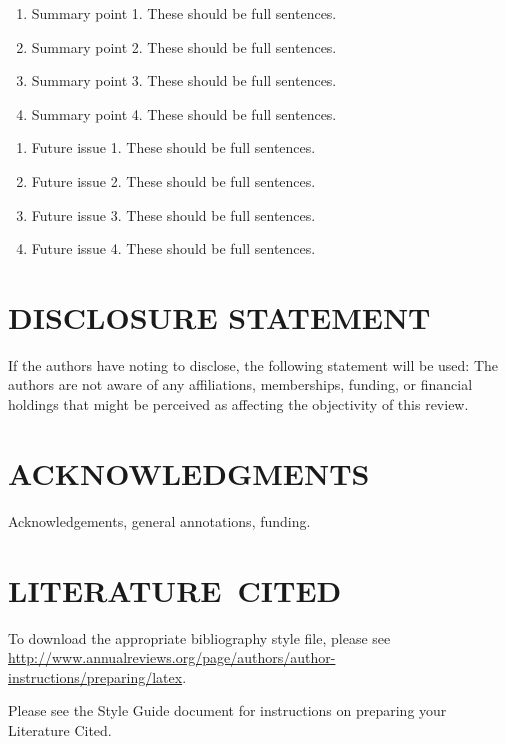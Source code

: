 \documentclass{ar-1col}
\begin{document}
\begin{summary}
\begin{enumerate}
\item Summary point 1. These should be full sentences.
\item Summary point 2. These should be full sentences.
\item Summary point 3. These should be full sentences.
\item Summary point 4. These should be full sentences.
\end{enumerate}
\end{summary}

\begin{issues}
\begin{enumerate}
\item Future issue 1. These should be full sentences.
\item Future issue 2. These should be full sentences.
\item Future issue 3. These should be full sentences.
\item Future issue 4. These should be full sentences.
\end{enumerate}
\end{issues}

\section*{DISCLOSURE STATEMENT}
If the authors have noting to disclose, the following statement will be used: The authors are not aware of any affiliations, memberships, funding, or financial holdings that
might be perceived as affecting the objectivity of this review. 

\section*{ACKNOWLEDGMENTS}
Acknowledgements, general annotations, funding.

%
\section*{LITERATURE\ CITED}

To download the appropriate bibliography style file, please see \url{http://www.annualreviews.org/page/authors/author-instructions/preparing/latex}. 


\noindent
Please see the Style Guide document for instructions on preparing your Literature Cited.
\end{document}
